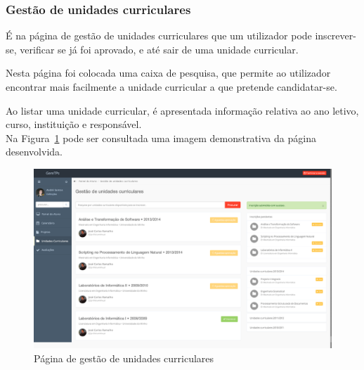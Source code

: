 \subsubsection{Gestão de unidades curriculares}

É na página de gestão de unidades curriculares que um utilizador pode inscrever-se, verificar se já foi aprovado, e até sair de uma unidade curricular.

Nesta página foi colocada uma caixa de pesquisa, que permite ao utilizador encontrar mais facilmente a unidade curricular a que pretende candidatar-se.

Ao listar uma unidade curricular, é apresentada informação relativa ao ano letivo, curso, instituição e responsável.\\ 

Na Figura~\ref{fig:student_subjects} pode ser consultada uma imagem demonstrativa da página desenvolvida.

\begin{figure}[H]
  \centering
  \includegraphics[width=1\textwidth,center]{images/implementacao/alunos/subjects}
  \caption{Página de gestão de unidades curriculares}
  \label{fig:student_subjects}
\end{figure}
